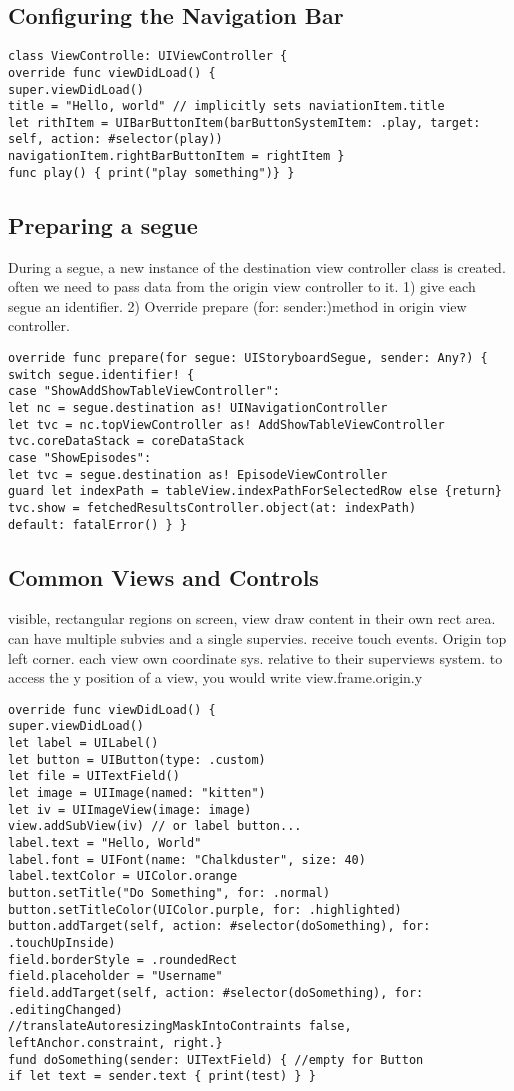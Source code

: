 \subsection{Configuring the Navigation Bar}
\begin{lstlisting}
class ViewControlle: UIViewController {
override func viewDidLoad() {
super.viewDidLoad()
title = "Hello, world" // implicitly sets naviationItem.title
let rithItem = UIBarButtonItem(barButtonSystemItem: .play, target: self, action: #selector(play))
navigationItem.rightBarButtonItem = rightItem }
func play() { print("play something")} }
\end{lstlisting}

\subsection{Preparing a segue}
During a segue, a new instance of the destination view controller class is created. often we need to pass data from the origin view controller to it. 1) give each segue an identifier. 2) Override prepare (for: sender:)method in origin view controller.
\begin{lstlisting}
override func prepare(for segue: UIStoryboardSegue, sender: Any?) {
switch segue.identifier! {
case "ShowAddShowTableViewController":
let nc = segue.destination as! UINavigationController
let tvc = nc.topViewController as! AddShowTableViewController
tvc.coreDataStack = coreDataStack
case "ShowEpisodes":
let tvc = segue.destination as! EpisodeViewController
guard let indexPath = tableView.indexPathForSelectedRow else {return}
tvc.show = fetchedResultsController.object(at: indexPath)
default: fatalError() } }
\end{lstlisting}

\subsection{Common Views and Controls}
visible, rectangular regions on screen, view draw content in their own rect area. can have multiple subvies and a single supervies. receive touch events. Origin top left corner. each view own coordinate sys. relative to their superviews system. to access the y position of a view, you would write view.frame.origin.y
\begin{lstlisting}
override func viewDidLoad() {
super.viewDidLoad()
let label = UILabel()
let button = UIButton(type: .custom)
let file = UITextField()
let image = UIImage(named: "kitten")
let iv = UIImageView(image: image)
view.addSubView(iv) // or label button...
label.text = "Hello, World"
label.font = UIFont(name: "Chalkduster", size: 40)
label.textColor = UIColor.orange
button.setTitle("Do Something", for: .normal)
button.setTitleColor(UIColor.purple, for: .highlighted)
button.addTarget(self, action: #selector(doSomething), for: .touchUpInside)
field.borderStyle = .roundedRect
field.placeholder = "Username"
field.addTarget(self, action: #selector(doSomething), for: .editingChanged)
//translateAutoresizingMaskIntoContraints false, leftAnchor.constraint, right.}
fund doSomething(sender: UITextField) { //empty for Button
if let text = sender.text { print(test) } }
\end{lstlisting}

